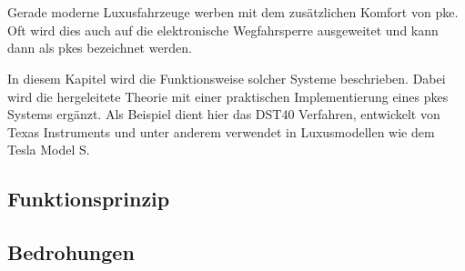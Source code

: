 \chapter{}

Gerade moderne Luxusfahrzeuge werben mit dem zusätzlichen Komfort von \gls{pke}. Oft wird dies auch auf die elektronische Wegfahrsperre ausgeweitet und kann dann als \gls{pkes} bezeichnet werden.

In diesem Kapitel wird die Funktionsweise solcher Systeme beschrieben. Dabei wird die hergeleitete Theorie mit einer praktischen Implementierung eines \gls{pkes} Systems ergänzt. Als Beispiel dient hier das DST40 Verfahren, entwickelt von Texas Instruments und unter anderem verwendet in Luxusmodellen wie dem Tesla Model S.

\section{Funktionsprinzip}

\section{Bedrohungen}
